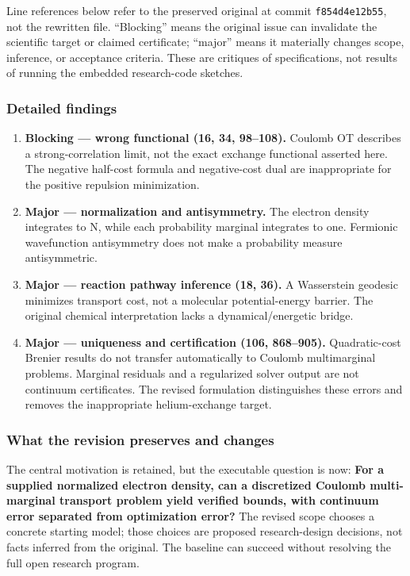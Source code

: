 \documentclass[
  11pt,
]{article}
\begin{document}
Line references below refer to the preserved original at commit
\texttt{f854d4e12b55}, not the rewritten file. ``Blocking'' means the
original issue can invalidate the scientific target or claimed
certificate; ``major'' means it materially changes scope, inference, or
acceptance criteria. These are critiques of specifications, not results
of running the embedded research-code sketches.

\subsubsection{Detailed findings}

\begin{enumerate}
\def\labelenumi{\arabic{enumi}.}
\item
  \textbf{Blocking --- wrong functional (16, 34, 98--108).} Coulomb OT
  describes a strong-correlation limit, not the exact exchange
  functional asserted here. The negative half-cost formula and
  negative-cost dual are inappropriate for the positive repulsion
  minimization.
\item
  \textbf{Major --- normalization and antisymmetry.} The electron
  density integrates to N, while each probability marginal integrates to
  one. Fermionic wavefunction antisymmetry does not make a probability
  measure antisymmetric.
\item
  \textbf{Major --- reaction pathway inference (18, 36).} A Wasserstein
  geodesic minimizes transport cost, not a molecular potential-energy
  barrier. The original chemical interpretation lacks a
  dynamical/energetic bridge.
\item
  \textbf{Major --- uniqueness and certification (106, 868--905).}
  Quadratic-cost Brenier results do not transfer automatically to
  Coulomb multimarginal problems. Marginal residuals and a regularized
  solver output are not continuum certificates. The revised formulation
  distinguishes these errors and removes the inappropriate
  helium-exchange target.
\end{enumerate}

\subsubsection{What the revision preserves and changes}

The central motivation is retained, but the executable question is now:
\textbf{For a supplied normalized electron density, can a discretized
Coulomb multi-marginal transport problem yield verified bounds, with
continuum error separated from optimization error?} The revised scope
chooses a concrete starting model; those choices are proposed
research-design decisions, not facts inferred from the original. The
baseline can succeed without resolving the full open research program.
\end{document}

